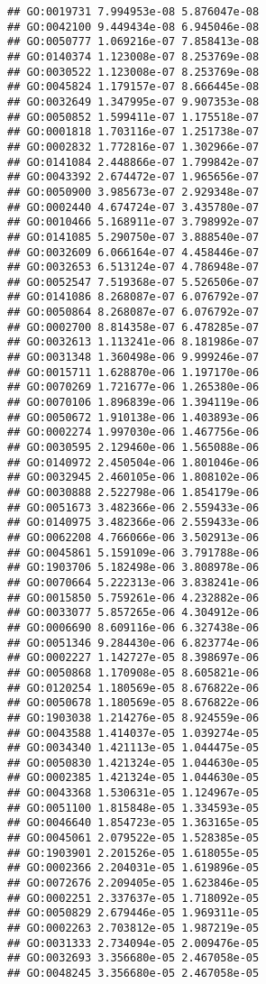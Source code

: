 \documentclass[
]{article}
\begin{document}
\begin{verbatim}
## GO:0019731 7.994953e-08 5.876047e-08
## GO:0042100 9.449434e-08 6.945046e-08
## GO:0050777 1.069216e-07 7.858413e-08
## GO:0140374 1.123008e-07 8.253769e-08
## GO:0030522 1.123008e-07 8.253769e-08
## GO:0045824 1.179157e-07 8.666445e-08
## GO:0032649 1.347995e-07 9.907353e-08
## GO:0050852 1.599411e-07 1.175518e-07
## GO:0001818 1.703116e-07 1.251738e-07
## GO:0002832 1.772816e-07 1.302966e-07
## GO:0141084 2.448866e-07 1.799842e-07
## GO:0043392 2.674472e-07 1.965656e-07
## GO:0050900 3.985673e-07 2.929348e-07
## GO:0002440 4.674724e-07 3.435780e-07
## GO:0010466 5.168911e-07 3.798992e-07
## GO:0141085 5.290750e-07 3.888540e-07
## GO:0032609 6.066164e-07 4.458446e-07
## GO:0032653 6.513124e-07 4.786948e-07
## GO:0052547 7.519368e-07 5.526506e-07
## GO:0141086 8.268087e-07 6.076792e-07
## GO:0050864 8.268087e-07 6.076792e-07
## GO:0002700 8.814358e-07 6.478285e-07
## GO:0032613 1.113241e-06 8.181986e-07
## GO:0031348 1.360498e-06 9.999246e-07
## GO:0015711 1.628870e-06 1.197170e-06
## GO:0070269 1.721677e-06 1.265380e-06
## GO:0070106 1.896839e-06 1.394119e-06
## GO:0050672 1.910138e-06 1.403893e-06
## GO:0002274 1.997030e-06 1.467756e-06
## GO:0030595 2.129460e-06 1.565088e-06
## GO:0140972 2.450504e-06 1.801046e-06
## GO:0032945 2.460105e-06 1.808102e-06
## GO:0030888 2.522798e-06 1.854179e-06
## GO:0051673 3.482366e-06 2.559433e-06
## GO:0140975 3.482366e-06 2.559433e-06
## GO:0062208 4.766066e-06 3.502913e-06
## GO:0045861 5.159109e-06 3.791788e-06
## GO:1903706 5.182498e-06 3.808978e-06
## GO:0070664 5.222313e-06 3.838241e-06
## GO:0015850 5.759261e-06 4.232882e-06
## GO:0033077 5.857265e-06 4.304912e-06
## GO:0006690 8.609116e-06 6.327438e-06
## GO:0051346 9.284430e-06 6.823774e-06
## GO:0002227 1.142727e-05 8.398697e-06
## GO:0050868 1.170908e-05 8.605821e-06
## GO:0120254 1.180569e-05 8.676822e-06
## GO:0050678 1.180569e-05 8.676822e-06
## GO:1903038 1.214276e-05 8.924559e-06
## GO:0043588 1.414037e-05 1.039274e-05
## GO:0034340 1.421113e-05 1.044475e-05
## GO:0050830 1.421324e-05 1.044630e-05
## GO:0002385 1.421324e-05 1.044630e-05
## GO:0043368 1.530631e-05 1.124967e-05
## GO:0051100 1.815848e-05 1.334593e-05
## GO:0046640 1.854723e-05 1.363165e-05
## GO:0045061 2.079522e-05 1.528385e-05
## GO:1903901 2.201526e-05 1.618055e-05
## GO:0002366 2.204031e-05 1.619896e-05
## GO:0072676 2.209405e-05 1.623846e-05
## GO:0002251 2.337637e-05 1.718092e-05
## GO:0050829 2.679446e-05 1.969311e-05
## GO:0002263 2.703812e-05 1.987219e-05
## GO:0031333 2.734094e-05 2.009476e-05
## GO:0032693 3.356680e-05 2.467058e-05
## GO:0048245 3.356680e-05 2.467058e-05

\end{verbatim}
\end{document}
